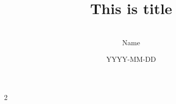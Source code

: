 \documentclass[autodetect-engine,a4paper]{jsarticle}
\begin{document}
\title{\vspace{-1.5zw}This is title}
\author{\vspace{-2zw}\\Name}
\date{\vspace{-0.5zw}\large YYYY-MM-DD}
\maketitle
\thispagestyle{fancy}

\vspace{-2.0zw}
\begin{abstract}
% 
\end{abstract}

\normalsize
\begin{multicols}{2}
% 
% 
% 
\end{multicols}
\end{document}
